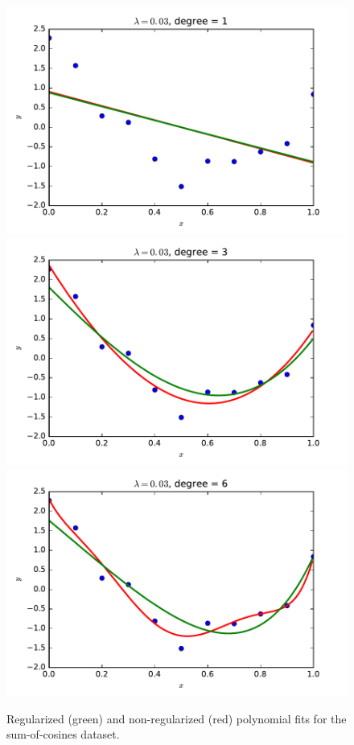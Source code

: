 \documentclass{article}
\begin{document}
\begin{multicols}{2}
\begin{figure}[p]
   \includegraphics[width=\picwidth]{img/3-1_ridge_lambd30_degree1.pdf}
   \includegraphics[width=\picwidth]{img/3-1_ridge_lambd30_degree3.pdf}
   \includegraphics[width=\picwidth]{img/3-1_ridge_lambd30_degree6.pdf}
   \caption{Regularized (green) and non-regularized (red) polynomial fits for the sum-of-cosines dataset.}
   \label{fig:ridge}
\end{figure}


\end{multicols}
\end{document}
